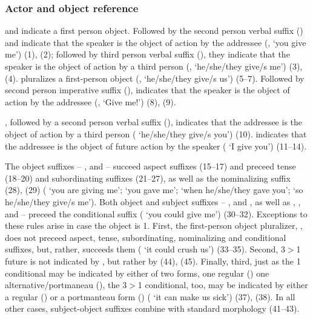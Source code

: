 \subsubsection{Actor and object reference}\label{ssec:actorobjref}
\tss{\AMV,\LT} and \tss{\ACH,\CH,\SP} indicate a first person object. Followed by the second person verbal suffix ()  and  indicate that the speaker is the object of action by the addressee (,  `you give me') (1), (2); followed by third person verbal suffix (), they indicate that the speaker is the object of action by a third person (,  `he/she/they give/s me') (3), (4).  pluralizes a first-person object (,  `he/she/they give/s us') (5--7). Followed by second person imperative suffix (),  indicates that the speaker is the object of action by the addressee (, `Give me!') (8), (9).

, followed by a second person verbal suffix (), indicates that the addressee is the object of action by a third person ( `he/she/they give/s you') (10).  indicates that the addressee is the object of future action by the speaker ( `I give you') (11--14).

The object suffixes -- ,  and  -- succeed aspect suffixes (15--17) and preceed tense (18--20) and subordinating suffixes (21--27), as well as the nominalizing suffix  (28), (29) ( `you are giving me';  `you gave me';  `when he/she/they gave you';  `so he/she/they give/s me'). Both object and subject suffixes -- ,  and , as well as , , and  -- preceed the conditional suffix  ( `you could give me') (30--32). Exceptions to these rules arise in case the object is 1. First, the first-person object pluralizer, , does not preceed aspect, tense, subordinating, nominalizing and conditional suffixes, but, rather, succeeds them ( `it could crush us') (33--35). Second, 3$>$1 future is not indicated by , but rather by  (44), (45). Finally, third, just as the 1 conditional may be indicated by either of two forms, one regular () one alternative/portmaneau (), the 3$>$1 conditional, too, may be indicated by either a regular () or a portmanteau form () ( `it can make us sick') (37), (38). In all other cases, subject-object suffixes combine with standard morphology (41--43).

